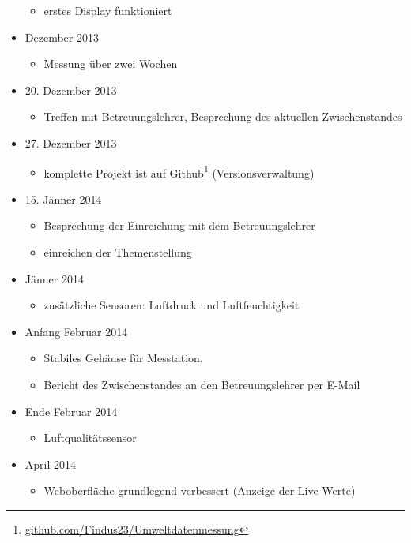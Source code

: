 \documentclass[12pt,a4paper,oneside,DIV=14]{scrartcl}
\begin{document}
\begin{multicols}{2}
\begin{itemize}
	\begin{itemize}
		\item erstes Display funktioniert
	\end{itemize}
	\item Dezember 2013
	\begin{itemize}
		\item Messung über zwei Wochen
	\end{itemize}
	\item 20. Dezember 2013
	\begin{itemize}
		\item Treffen mit Betreuungslehrer, Besprechung des aktuellen Zwischenstandes
	\end{itemize}
	\item 27. Dezember 2013
	\begin{itemize}
		\item komplette Projekt ist auf Github\footnote{\href{https://github.com/Findus23/Umweltdatenmessung}{github.com/Findus23/Umweltdatenmessung}} (Versionsverwaltung)
	\end{itemize}
	\item 15. Jänner 2014
	\begin{itemize}
		\item Besprechung der Einreichung mit dem Betreuungslehrer
		\item einreichen der Themenstellung
	\end{itemize}
	\item Jänner 2014
	\begin{itemize}
		\item zusätzliche Sensoren: Luftdruck und Luftfeuchtigkeit
	\end{itemize}
	\item Anfang Februar 2014
	\begin{itemize}
		\item Stabiles Gehäuse für Messtation.
		\item Bericht des Zwischenstandes an den Betreuungslehrer per E-Mail
	\end{itemize}
	\item Ende Februar 2014
	\begin{itemize}
		\item Luftqualitätssensor
	\end{itemize}
	\item April 2014
	\begin{itemize}
		\item Weboberfläche grundlegend verbessert (Anzeige der Live-Werte)
	\end{itemize}

\end{itemize}
\end{multicols}
\end{document}
